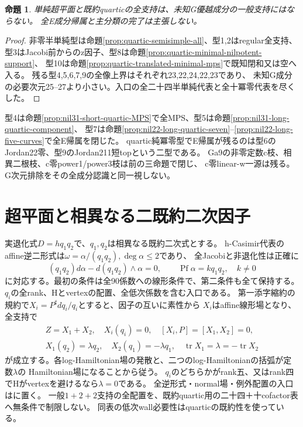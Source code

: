 \documentclass[a4paper,11pt]{ltjsarticle}
\newtheorem{proposition}{命題}[section]
\theoremstyle{definition}
\begin{document}
\begin{proposition}\label{prop:hyperplane-quartic-all-G}
単純超平面と既約quarticの全支持は、未知G優越成分の一般支持にはならない。
全E成分帰属と主分類の完了は主張しない。
\end{proposition}
\begin{proof}
非零半単純型は命題\ref{prop:quartic-semisimple-all}、型1,2はregular全支持、
型3はJacobi前からのz因子、型8は命題\ref{prop:quartic-minimal-nilpotent-support}、
型10は命題\ref{prop:quartic-translated-minimal-mps}で既知閉和又は空へ入る。
残る型4,5,6,7,9の全像上界はそれぞれ23,22,24,22,23であり、
未知G成分の必要次元25--27より小さい。入口の全二十四半単純代表と全十冪零代表を尽くした。
\end{proof}
型4は命題\ref{prop:nil31-short-quartic-MPS}で全MPS、型5は命題\ref{prop:nil31-long-quartic-component}、
型7は命題\ref{prop:nil22-long-quartic-seven}--\ref{prop:nil22-long-five-curves}で全E帰属を閉じた。
quartic純冪零型でE帰属が残るのは型6のJordan22零、型9のJordan211短topという二型である。
Ga9の非零定数c枝、相異二根枝、c零power1/power3枝は前の三命題で閉じ、
c零linear-w一源は残る。G次元排除をその全成分認識と同一視しない。

\section{超平面と相異なる二既約二次因子}
実退化式$D=hq_1q_2$で、$q_1,q_2$は相異なる既約二次式とする。
h-Casimir代表のaffine逆二形式は$\omega=\alpha/(q_1q_2),\deg\alpha\le2$であり、
全Jacobiと非退化性は正確に
\[
 (q_1q_2)d\alpha-d(q_1q_2)\wedge\alpha=0,\qquad
 \operatorname{Pf}\alpha=kq_1q_2,\quad k\ne0
\]
に対応する。最初の条件は全90係数への線形条件で、第二条件も全て保持する。
$q_i$の全rank、Hとvertexの配置、全低次係数を含む入口である。
第一添字縮約の規約で$X_i=P^\sharp dq_i/q_i$とすると、因子の互いに素性から
$X_i$はaffine線形場となり、全支持で
\[
\begin{gathered}
 Z=X_1+X_2,\quad X_i(q_i)=0,\quad[X_i,P]=[X_1,X_2]=0,\\
 X_1(q_2)=\lambda q_2,\quad X_2(q_1)=-\lambda q_1,
 \quad\operatorname{tr}X_1=\lambda=-\operatorname{tr}X_2
\end{gathered}
\]
が成立する。各log-Hamiltonian場の発散と、二つのlog-Hamiltonianの括弧が定数$\lambda$の
Hamiltonian場になることから従う。
$q_i$のどちらかがrank五、又はrank四でHがvertexを避けるなら$\lambda=0$である。
全逆形式・normal場・例外配置の入口はに置く。
一般$1+2+2$支持の全配置を、既約quartic用の二十四＋十cofactor表へ無条件で制限しない。
同表の低次wall必要性はquarticの既約性を使っている。
\end{document}
